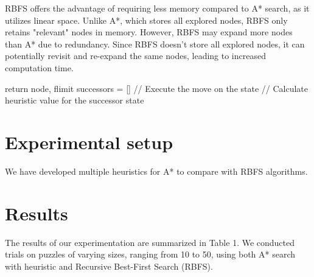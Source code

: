 \documentclass{article}
\begin{document}
RBFS offers the advantage of requiring less memory compared to A* search, as it utilizes linear space. Unlike A*, which stores all explored nodes, RBFS only retains "relevant" nodes in memory. However, RBFS may expand more nodes than A* due to redundancy. Since RBFS doesn't store all explored nodes, it can potentially revisit and re-expand the same nodes, leading to increased computation time.
\begin{algorithm}
   
  \State return node, flimit
        \EndIf
        \State successors = []
             // Execute the move on the state
             // Calculate heuristic value for the successor state
            \EndIf
            \EndFor
        \EndIf

            \EndIf
            \EndIf
            \EndWhile
  \label{alg:RBFS}
\end{algorithm}

\section{Experimental setup}

We have developed multiple heuristics for A* to compare with RBFS algorithms.  


\section{Results}

The results of our experimentation are summarized in Table 1. We conducted trials on puzzles of varying sizes, ranging from 10 to 50, using both A* search with heuristic and Recursive Best-First Search (RBFS).
\end{document}

